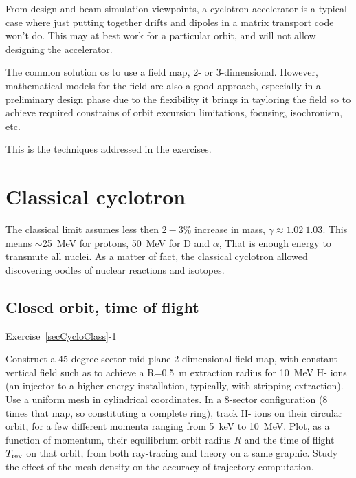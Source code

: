 From design and beam simulation viewpoints, a cyclotron accelerator is a typical case 
where just putting together drifts and dipoles in a matrix transport 
code won't do. This may at best work for a particular orbit, and will not allow designing the accelerator. 

The common solution os to use a field map, 2- or 3-dimensional. However, mathematical models for the field 
are also a good approach, especially in a preliminary design phase due to the flexibility it brings 
in tayloring the field so to achieve required constrains of orbit excursion limitations, 
focusing, isochronism, etc.

This is the techniques addressed in the exercises. 

\section{Classical cyclotron \label{secCycloClass}}


The classical limit assumes 
 less then $2-3$\% increase in mass, $\gamma\approx 1.02~1.03$.
This means  $\sim$25~MeV for protons, 50~MeV for D and $\alpha$, 
That is enough energy to transmute all nuclei. As a matter of fact, the classical cyclotron allowed discovering 
oodles of nuclear reactions and isotopes. 



\subsection{Closed orbit, time of flight \label{secCycloClassTra}}

\smallskip
\noindent {\small $\bullet$} Exercise~\ref{secCycloClass}-1 

Construct a 45-degree sector mid-plane 2-dimensional field map, with constant vertical field such as to 
achieve a R=0.5~m extraction radius for  10~MeV H- ions (an injector to a higher energy installation, 
typically, with stripping extraction). 
Use a uniform mesh in cylindrical coordinates. 
In a 8-sector configuration (8 times that map, so constituting a complete ring), 
track H- ions on their circular orbit, for a few different momenta ranging from 5~keV to 10~MeV. Plot, 
as a function of momentum, their 
equilibrium orbit radius $R$ and the time of flight $T_{\rm rev}$ on that orbit, 
 from both ray-tracing and  theory on a same graphic. 
Study the effect of the mesh density on the accuracy of trajectory computation. 



